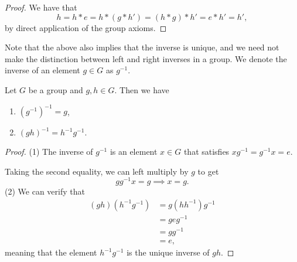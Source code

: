\begin{proof}

  We have that
  $$h = h*e = h*(g*h') = (h*g)*h' = e*h' = h',$$
  by direct application of the group axioms.
\end{proof}
Note that the above also implies that the inverse is unique, and we need not make the distinction between left and right inverses in a group. We denote the inverse of an element $g\in G$ as $g^{-1}.$


\begin{proposition}
     Let $G$ be a group and $g,h \in G$. Then we have
     \begin{enumerate}
        \item $(g^{-1})^{-1} = g$,
        \item $(gh)^{-1} = h^{-1} g^{-1}.$
    \end{enumerate}
\end{proposition}
\begin{proof}
        (1) The inverse of $g^{-1}$ is an element $x \in G$ that satisfies $xg^{-1} = g^{-1}x = e.$ 
        
        Taking the second equality, we can left multiply by $g$ to get
        $$
        gg^{-1}x = g \implies x = g.
        $$
        (2) We can verify that
        \begin{align*}
            (gh)( h^{-1} g^{-1}) &= g(h h^{-1})g^{-1} \\
            &= g e g^{-1} \\
            &= g g^{-1} \\
            &= e,
        \end{align*}
        meaning that the element $h^{-1} g^{-1}$ is the unique inverse of $gh$.
\end{proof}


